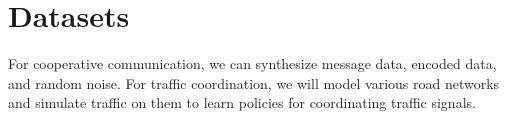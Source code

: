 
\section{Datasets}
\label{sec:data}

For cooperative communication, we can synthesize message data, encoded data, and
random noise. For traffic coordination, we will model
various road networks and simulate traffic on them to learn policies for
coordinating traffic signals.
